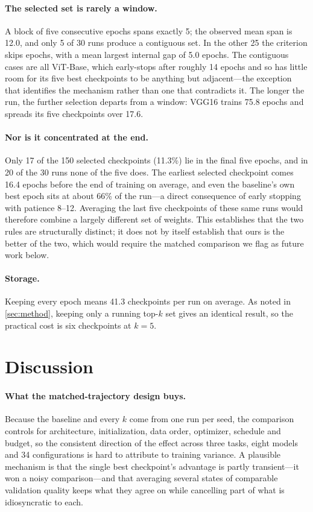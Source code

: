 \paragraph{The selected set is rarely a window.}
A block of five consecutive epochs spans exactly 5; the observed mean span is
12.0, and only 5 of 30 runs produce a contiguous set. In the other 25 the
criterion skips epochs, with a mean largest internal gap of 5.0 epochs. The
contiguous cases are all ViT-Base, which early-stops after roughly 14 epochs
and so has little room for its five best checkpoints to be anything but
adjacent---the exception that identifies the mechanism rather than one that
contradicts it. The longer the run, the further selection departs from a
window: VGG16 trains 75.8 epochs and spreads its five checkpoints over 17.6.

\paragraph{Nor is it concentrated at the end.}
Only 17 of the 150 selected checkpoints (11.3\%) lie in the final five epochs,
and in 20 of the 30 runs none of the five does. The earliest selected
checkpoint comes 16.4 epochs before the end of training on average, and even
the baseline's own best epoch sits at about 66\% of the run---a direct
consequence of early stopping with patience 8--12. Averaging the last five
checkpoints of these same runs would therefore combine a largely different set
of weights.
This establishes that the two rules are structurally distinct; it does not by
itself establish that ours is the better of the two, which would require the
matched comparison we flag as future work below.

\paragraph{Storage.}
Keeping every epoch means 41.3 checkpoints per run on average. As noted in
\cref{sec:method}, keeping only a running top-$k$ set gives an identical
result, so the practical cost is six checkpoints at $k{=}5$.

\section{Discussion}
\label{sec:discussion}

\paragraph{What the matched-trajectory design buys.}
Because the baseline and every $k$ come from one run per seed, the comparison
controls for architecture, initialization, data order, optimizer, schedule and
budget, so the consistent direction of the effect across three tasks, eight models and 34
configurations is hard to attribute to training variance. A plausible mechanism
is that the single best checkpoint's advantage is partly transient---it won a
noisy comparison---and that averaging several states of comparable validation
quality keeps what they agree on while cancelling part of what is idiosyncratic
to each.

